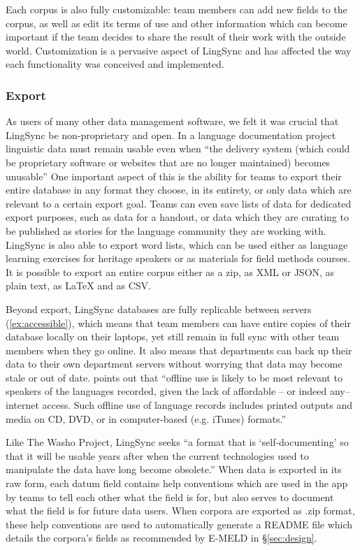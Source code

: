\documentclass[letterpaper, 12pt, dvips]{mitwpl}
\begin{document}
Each corpus is also fully customizable: team members can add new fields to the corpus,
as well as edit its terms of use and other information which can become important if the team decides to share the result of their work with the outside world.
Customization is a pervasive aspect of LingSync and has affected the way each functionality was conceived and implemented.


\subsubsection{Export}

As users of many other data management software,
we felt it was crucial that LingSync be non-proprietary and open. In a language documentation project linguistic data must remain usable even when ``the delivery system (which could be proprietary software or websites that are no longer maintained) becomes unusable'' \citep[p.132]{Thieberger:2012}
One important aspect of this is the ability for teams to export their entire database in any format they choose,
in its entirety, or only data which are relevant to a certain export goal.
Teams can even save lists of data for dedicated export purposes,
such as data for a handout,
or data which they are curating to be published as stories for the language community they are working with.
LingSync is also able to export word lists,
which can be used either as language learning exercises for heritage speakers or as materials for field methods courses.
It is possible to export an entire corpus either as a zip,
as XML or JSON,
as plain text,
as LaTeX and  as CSV.


Beyond export,
LingSync databases are fully replicable between servers (\ref{ex:accessible}),
which means that team members can have entire copies of their database locally on their laptops,
yet still remain in full sync with other team members when they go online.
It also means that departments can back up their data to their own department servers without worrying that data may become stale or out of date.
\cite{Thieberger:2012} points out that ``offline use is likely to be most relevant to speakers of the languages recorded, given the lack of affordable -- or indeed any-- internet access. Such offline use of language records includes printed outputs and media on CD, DVD, or in computer-based (e.g. iTunes) formats.'' 



Like The Washo Project, LingSync seeks ``a format that is `self-documenting' so that it will be usable years after when the current technologies used to manipulate the data have long become obsolete.'' \citep[p.4]{Cihlar:2008} When data is exported in its raw form, each datum field contains help conventions which are used in the app by teams to tell each other what the field is for, but also serves to document what the field is for future data users. When corpora are exported as .zip format, these help conventions are used to automatically generate a README file which details the corpora's fields as recommended by E-MELD in \S \ref{sec:design}.
\end{document}
